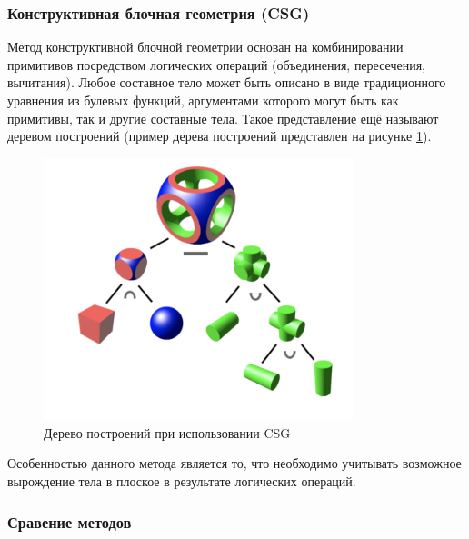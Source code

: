 \subsubsection{Конструктивная блочная геометрия (CSG)}

Метод конструктивной блочной геометрии \cite{csg} основан на комбинировании 
примитивов посредством логических операций (объединения, пересечения, 
вычитания).
Любое составное тело может быть описано в виде традиционного 
уравнения из булевых функций, аргументами которого могут быть как 
примитивы, так и другие составные тела. 
Такое представление ещё называют 
деревом построений (пример дерева построений представлен на рисунке \ref{fig:csg}).
\newpage

\begin{figure}[h]
	\centering
	\captionsetup{justification=centering}
	\includegraphics[width=90mm]{img/csg.png}
	\caption{Дерево построений при использовании CSG}
	\label{fig:csg}
\end{figure}


Особенностью данного метода является то, что необходимо учитывать 
возможное вырождение тела в плоское в результате логических операций.


\subsubsection{Сравение методов}

